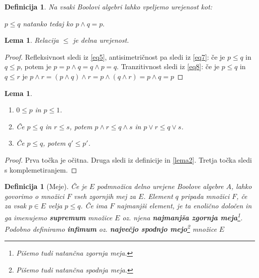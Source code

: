 \documentclass{amsart}
\newtheorem{lema}[izrek]{Lema}
\newtheorem{definicija}[izrek]{Definicija}
\begin{document}
\begin{definicija}
    Na vsaki Boolovi algebri lahko vpeljemo urejenost kot:
    \begin{center}
        \(p \leq q \) natanko tedaj ko \(p \wedge q  = p.\)
    \end{center}
\end{definicija}

\begin{lema}
    Relacija \(\leq\) je delna urejenost.
\end{lema}

\begin{proof}
    Refleksivnost sledi iz \eqref{eq5}, antisimetričnost pa sledi iz \eqref{eq7}: če je \(p \leq q\) in \(q \leq p\), potem
    je \(p = p \wedge q = q \wedge p = q\). Tranzitivnost sledi iz \eqref{eq8}:
    če je \(p \leq q\) in \(q \leq r\) je \(p\wedge r = \left(p \wedge q\right) \wedge r = p \wedge \left(q \wedge r\right) = p \wedge q = p\)
\end{proof}

\begin{lema}
    \label{lema3}
    \begin{enumerate}
        \item \(0 \leq p\) in \(p \leq 1\).
        \item Če \(p \leq q\) in \(r \leq s\), potem \(p \wedge r \leq q \wedge s\) in \(p \vee r \leq q \vee s\). \label{lema3.2}
        \item Če \(p \leq q\), potem \(q' \leq p'\).
    \end{enumerate}
\end{lema}

\begin{proof}
    Prva točka je očitna. Druga sledi iz definicije in \ref{lema2}. Tretja točka sledi s komplemetiranjem.

\end{proof}

\begin{definicija}[Meje]
    Če je $E$ podmnožica delno urejene Boolove algebre \(A\), lahko govorimo o množici \(F\) vseh zgornjih mej za \(E\).
    Element \(q\) pripada množici \(F\), če za vsak \(p \in E\) velja \(p \leq q\). Če ima \(F\) najmanjši element, je ta 
    enolično določen in ga imenujemo {\bf supremum} množice \(E\) oz. njena {\bf najmanjša zgornja meja}\footnote{Pišemo tudi natančna zgornja meja.}. Podobno 
    definiramo {\bf infimum} oz. {\bf največjo spodnjo mejo}\footnote{Pišemo tudi natančna spodnja meja.} množice \(E\)
\end{definicija}
\end{document}
